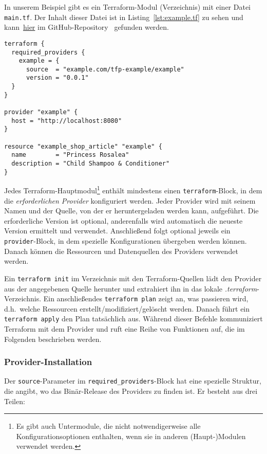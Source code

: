 \documentclass[paper=a4,11pt,numbers=noenddot]{article}
\begin{document}
In unserem Beispiel gibt es ein Terraform-Modul (Verzeichnis) mit einer Datei \verb'main.tf'. Der Inhalt dieser Datei ist in Listing~\ref{lst:example.tf} zu sehen und kann~\href{https://github.com/ecky-l/terraform-provider-example/blob/main/src/exampletf}{hier} im GitHub-Repository~\autocite{ecky-l_terraform-provider-example_nodate} gefunden werden.

\begin{lstlisting}[label=lst:example.tf]
terraform {
  required_providers {
    example = {
      source  = "example.com/tfp-example/example"
      version = "0.0.1"
  }
}

provider "example" {
  host = "http://localhost:8080"
}

resource "example_shop_article" "example" {
  name        = "Princess Rosalea"
  description = "Child Shampoo & Conditioner"
}
\end{lstlisting}

Jedes Terraform-Hauptmodul\footnote{Es gibt auch Untermodule, die nicht notwendigerweise alle Konfigurationsoptionen enthalten, wenn sie in anderen (Haupt-)Modulen verwendet werden.} enthält mindestens einen \verb'terraform'-Block, in dem die \emph{erforderlichen Provider} konfiguriert werden. Jeder Provider wird mit seinem Namen und der Quelle, von der er heruntergeladen werden kann, aufgeführt. Die erforderliche Version ist optional, anderenfalls wird automatisch die neueste Version ermittelt und verwendet. Anschließend folgt optional jeweils ein \verb'provider'-Block, in dem spezielle Konfigurationen übergeben werden können. Danach können die Ressourcen und Datenquellen des Providers verwendet werden.

Ein \verb'terraform init' im Verzeichnis mit den Terraform-Quellen lädt den Provider aus der angegebenen Quelle herunter und extrahiert ihn in das lokale \emph{.terraform}-Verzeichnis. Ein anschließendes \verb'terraform plan' zeigt an, was passieren wird, d.h.\ welche Ressourcen erstellt/modifiziert/gelöscht werden. Danach führt ein \verb'terraform apply' den Plan tatsächlich aus. Während dieser Befehle kommuniziert Terraform mit dem Provider und ruft eine Reihe von Funktionen auf, die im Folgenden beschrieben werden.

\subsubsection{Provider-Installation}
\label{subsubsec:prov-inst}

Der \verb'source'-Parameter im \verb'required_providers'-Block hat eine spezielle Struktur, die angibt, wo das Binär-Release des Providers zu finden ist. Er besteht aus drei Teilen:
\end{document}
